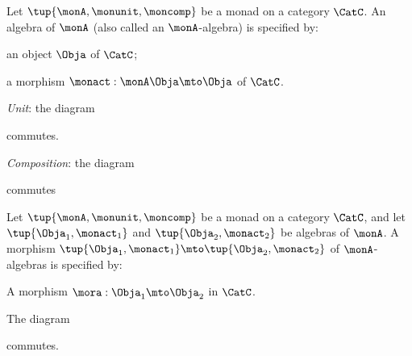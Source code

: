\begin{ctdefinition}
Let $\tup{\monA, \monunit, \moncomp}$ be a monad on a category $\CatC$. An algebra of $\monA$ (also called an $\monA$-algebra) is specified by: \
\constit
\begin{compactenum}
\item an object $\Obja$ of $\CatC$;
\item a morphism $\monact: \monA \Obja \mto \Obja$ of $\CatC$. 
\end{compactenum}
\condit
\begin{compactenum}
\item \emph{Unit}: the diagram 
\begin{center}
  \end{center}
commutes.
\item \emph{Composition}: the diagram
\begin{center}
  \end{center}
commutes
\end{compactenum}
\end{ctdefinition}


\begin{ctdefinition}
Let $\tup{\monA, \monunit, \moncomp}$ be a monad on a category $\CatC$, and let $\tup{\Obja_1, \monact_1}$ and $\tup{\Obja_2, \monact_2}$ be algebras of $\monA$. A morphism $\tup{\Obja_1, \monact_1} \mto \tup{\Obja_2, \monact_2}$ of $\monA$-algebras is specified by:

\constit
\begin{compactenum}
\item A morphism $\mora : \Obja_1 \mto \Obja_2$ in $\CatC$.
\end{compactenum}
\condit
\begin{compactenum}
\item The diagram
\begin{center}
  \end{center}
commutes. 
\end{compactenum}
\end{ctdefinition}


